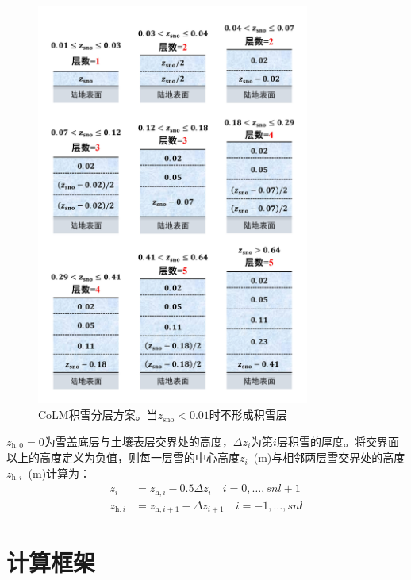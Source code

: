 {
  \begin{figure}[htbp]
    \centering
    \includegraphics[width=0.8\textwidth]{Figures/模式构架/积雪分层.jpg}
    \caption[CoLM积雪分层方案]{CoLM积雪分层方案。当$z_{\mathrm{sno}}<0.01$时不形成积雪层}
    \label{fig:积雪分层}
  \end{figure}
}

$z_{\mathrm{h,0}}=0$为雪盖底层与土壤表层交界处的高度，$\Delta z_{i}$为第$i$层积雪的厚度。将交界面以上的高度定义为负值，则每一层雪的中心高度$z_i$~(m)与相邻两层雪交界处的高度$z_{\mathrm{h},i}$~(m)计算为：
\begin{equation}
  \begin{aligned}
    z_{i} &= z_{\mathrm{h},i}-0.5 \Delta z_{i} \quad i=0, \ldots, snl+1 \\
    z_{\mathrm{h},i} &= z_{\mathrm{h}, i+1}-\Delta z_{i+1}  \quad i=-1, \ldots, snl
  \end{aligned}
\end{equation}


\section{计算框架}\label{计算框架}

